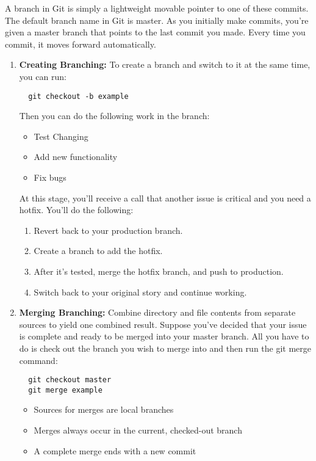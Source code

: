 \documentclass[draftclsnofoot,journal,onecolumn,12pt]{IEEEtran}
\begin{document}
A branch in Git is simply a lightweight movable pointer to one of these commits. The default branch name in Git is master. As you initially make commits, you’re given a master branch that points to the last commit you made. Every time you commit, it moves forward automatically.

\begin{enumerate}
\item \textbf{Creating Branching:} To create a branch and switch to it at the same time, you can run:
\begin{verbatim}
  git checkout -b example
\end{verbatim}
Then you can do the following work in the branch:
  \begin{itemize}
    \item Test Changing
    \item Add new functionality
    \item Fix bugs
  \end{itemize}
At this stage, you’ll receive a call that another issue is critical and you need a hotfix. You’ll do the following:
\begin{enumerate}
  \item Revert back to your production branch.
  \item Create a branch to add the hotfix.
  \item After it’s tested, merge the hotfix branch, and push to production.
  \item Switch back to your original story and continue working.
\end{enumerate}
\item \textbf{Merging Branching:} Combine directory and file contents from separate sources to yield one combined result. Suppose you’ve decided that your issue is complete and ready to be merged into your master branch. All you have to do is check out the branch you wish to merge into and then run the git merge command:
\begin{verbatim}
  git checkout master
  git merge example
\end{verbatim}

\begin{itemize}
  \item Sources for merges are local branches
  \item Merges always occur in the current, checked-out branch
  \item A complete merge ends with a new commit
\end{itemize}


\end{enumerate}
\end{document}
